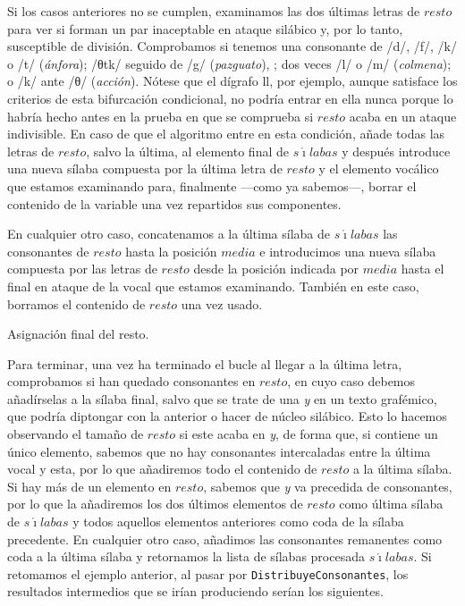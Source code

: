 Si los casos anteriores no se cumplen, examinamos las dos últimas letras de $resto$ para ver si forman un par inaceptable en ataque silábico y, por lo tanto, susceptible de división. Comprobamos si tenemos una consonante de /d/, /f/, /k/ o /t/ (\textit{ánfora}); /θtk/ seguido de /g/ (\textit{pazguato}), ; dos veces /l/ o /m/ (\textit{colmena}); o /k/ ante /θ/ (\textit{acción}). Nótese que el dígrafo \textlangle{}ll\textrangle{}, por ejemplo, aunque satisface los criterios de esta bifurcación condicional, no podría entrar en ella nunca porque lo habría hecho antes en la prueba en que se comprueba si $resto$ acaba en un ataque indivisible. En caso de que el algoritmo entre en esta condición, añade todas las letras de $resto$, salvo la última, al elemento final de  $s\acute{\imath}labas$ y después introduce una nueva sílaba compuesta por la última letra de $resto$ y el elemento vocálico que estamos examinando para, finalmente —como ya sabemos—, borrar el contenido de la variable una vez repartidos sus componentes.

En cualquier otro caso, concatenamos a la última sílaba de $s\acute{\imath}labas$ las consonantes de  $resto$ hasta la posición $media$ e introducimos una nueva sílaba compuesta por las letras de  $resto$ desde la posición indicada por $media$ hasta el final en ataque de la vocal que estamos examinando. También en este caso, borramos el contenido de  $resto$ una vez usado.

\begin{algorithm}[!ht] %
	\caption{Asignación final del resto.}\label{list:unefonemasresto}
\end{algorithm}

Para terminar, una vez ha terminado el bucle al llegar a la última letra, comprobamos si han quedado consonantes en  $resto$, en cuyo caso debemos añadírselas a la sílaba final, salvo que se trate de una \textit{y} en un texto grafémico, que podría diptongar con la anterior o hacer de núcleo silábico. Esto lo hacemos observando el tamaño de  $resto$ si este acaba en \textit{y}, de forma que, si contiene un único elemento, sabemos que no hay consonantes intercaladas entre la última vocal y esta, por lo que añadiremos todo el contenido de  $resto$ a la última sílaba. Si hay más de un elemento en  $resto$, sabemos que \textit{y} va precedida de consonantes, por lo que la añadiremos los dos últimos elementos de  $resto$ como última sílaba de $s\acute{\imath}labas$ y todos aquellos elementos anteriores como coda de la sílaba precedente. En cualquier otro caso, añadimos las consonantes remanentes como coda a la última sílaba y retornamos la lista de sílabas procesada $s\acute{\imath}labas$. Si retomamos el ejemplo anterior, al pasar por \texttt{DistribuyeConsonantes}, los resultados intermedios que se irían produciendo serían los siguientes.

